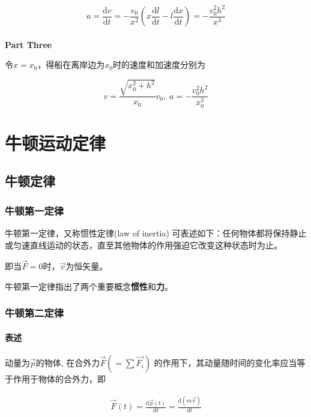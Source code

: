\documentclass[
	12pt, %
	a4paper, %
]{myLegrandOrangeBook}
\newcommand{\rmd}{\mathrm{d}}
\newcommand{\deriv}[2]{\frac{\rmd #1}{\rmd #2}}
\begin{document}
    \[
        a = \deriv{v}{t} = - \frac{v_{0}}{x^{2}} \left(x \deriv{l}{t} - l \deriv{x}{t}\right)
        = -\frac{v_{0}^{2} h^{2}}{x^{3}}
    \]
    \\

    \textbf{Part Three}

    令\(x=x_{0}\)，得船在离岸边为\(x_{0}\)时的速度和加速度分别为

    \[
        v = \frac{\sqrt{x_{0}^{2} + h^2}}{x_{0}} v_{0},\;
        a = -\frac{v_{0}^{2} h^{2}}{x_{0}^{3}}
    \]

\chapter{牛顿运动定律}

\section{牛顿定律}

\subsection{牛顿第一定律}

    牛顿第一定律，又称惯性定律(law of inertia) 可表述如下：任何物体都将保持静止
    或匀速直线运动的状态，直至其他物体的作用强迫它改变这种状态时为止。

    即当\(\overrightarrow{F} = 0\)时，\(\overrightarrow{v}\)为恒矢量。

    牛顿第一定律指出了两个重要概念\textbf{惯性}和\textbf{力}。

\subsection{牛顿第二定律}

\subsubsection{表述}

    动量为\(\overrightarrow{p}\)的物体, 在合外力\(\overrightarrow{F} \left(=\sum \overrightarrow{F_{i}}\right)\)
    的作用下，其动量随时间的变化率应当等于作用于物体的合外力，即

    \begin{align}
        \overrightarrow{F}\left(t\right) = \deriv{\overrightarrow{p}\left(t\right)}{t} =
        \deriv{\left(m\overrightarrow{v}\right)}{t}
    \end{align}
\end{document}
